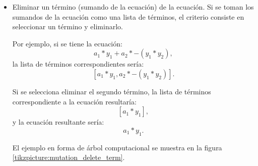 \begin{itemize}
    \item Eliminar un término (sumando de la ecuación) de la ecuación. Si se toman los sumandos de la ecuación como una lista de términos, el criterio consiste en seleccionar un término y eliminarlo.

          Por ejemplo, si se tiene la ecuación:
          $$a_1 * y_1 + a_2 * -(y_1 * y_2),$$
          la lista de términos correspondientes sería:
          $$[a_1*y_1, a_2 * -(y_1 * y_2)].$$

          Si se selecciona eliminar el segundo término, la lista de términos correspondiente a la ecuación resultaría:
          $$[a_1 * y_1],$$
          y la ecuación resultante sería:
          $$a_1 * y_1.$$

          El ejemplo en forma de árbol computacional se muestra en la figura \ref{tikzpicture:mutation_delete_term}.

          \begin{center}


\end{center}
\end{itemize}
